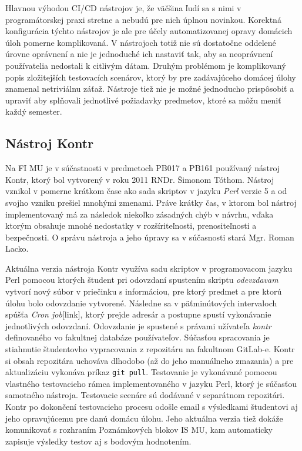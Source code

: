 \documentclass[
  digital, %
  twoside, %
  table,   %
  lof,     %
  lot,     %
]{fithesis3}
\begin{document}
Hlavnou výhodou CI/CD nástrojov je, že väčšina ľudí sa s nimi v programátorskej praxi stretne a nebudú pre nich úplnou novinkou. Korektná konfigurácia týchto nástrojov je ale pre účely automatizovanej opravy domácich úloh pomerne komplikovaná. V nástrojoch totiž nie sú dostatočne oddelené úrovne oprávnení a nie je jednoduché ich nastaviť tak, aby sa neoprávnení používatelia nedostali k citlivým dátam. Druhým problémom je komplikovaný popis zložitejších testovacích scenárov, ktorý by pre zadávajúceho domácej úlohy znamenal netriviálnu záťaž. Nástroje tiež nie je možné jednoducho prispôsobiť a upraviť aby splňovali jednotlivé požiadavky predmetov, ktoré sa môžu meniť každý semester.  

\subsection{Nástroj Kontr}

Na FI MU je v súčastnosti v predmetoch PB017 a PB161 používaný nástroj Kontr, ktorý bol vytvorený v roku 2011 RNDr. Šimonom Tóthom. Nástroj vznikol v pomerne krátkom čase ako sada skriptov v jazyku \emph{Perl} verzie 5 a od svojho vzniku prešiel mnohými zmenami. Práve krátky čas, v ktorom bol nástroj implementovaný má za následok niekoľko zásadných chýb v návrhu, vďaka ktorým obsahuje mnohé nedostatky v rozšíriteľnosti, prenositeľnosti a bezpečnosti. O správu nástroja a jeho úpravy sa v súčasnosti stará Mgr. Roman Lacko. 

Aktuálna verzia nástroja Kontr využíva sadu skriptov v programovacom jazyku Perl pomocou ktorých študent pri odovzdaní spustením skriptu \emph{odevzdavam} vytvorí nový súbor v priečinku s informáciou, pre ktorý predmet a pre ktorú úlohu bolo odovzdanie vytvorené. Následne sa v päťminútových intervaloch spúšťa \textit{Cron job}[link], ktorý prejde adresár a postupne spustí vykonávanie jednotlivých odovzdaní. Odovzdanie je spustené s právami užívateľa \emph{kontr} definovaného vo fakultnej databáze používateľov. Súčasťou spracovania je stiahnutie študentovho vypracovania z repozitáru na fakultnom GitLab-e. Kontr si obsah repozitára uchováva dlhodobo (až do jeho manuálneho zmazania) a pre aktualizáciu vykonáva príkaz \texttt{git pull}. Testovanie je vykonávané pomocou vlastného testovacieho rámca implementovaného v jazyku Perl, ktorý je súčasťou samotného nástroja. Testovacie scenáre sú dodávané v separátnom repozitári. Kontr po dokončení testovacieho procesu odošle email s výsledkami študentovi aj jeho opravujúcemu pre danú domácu úlohu. Jeho aktuálna verzia tiež dokáže komunikovať s rozhraním Poznámkových blokov IS MU, kam automaticky zapisuje výsledky testov aj s bodovým hodnotením.
\end{document}
